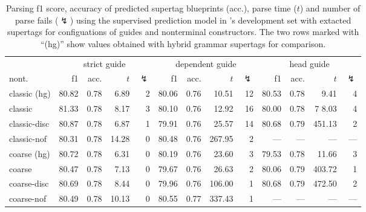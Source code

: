 \documentclass[../../document.tex]{subfiles}
\begin{document}
    \begin{table}
        \caption{\label{tbl:gridsearch:dcp:2}
        Parsing f1 score, accuracy of predicted supertag blueprints (acc.), parse time ($t$) and number of parse fails ($\lightning$) using the supervised prediction model in \negra{}'s development set with extacted  supertags for configuations of guides and nonterminal constructors. The two rows marked with ``(hg)'' show values obtained with hybrid grammar supertags for comparison.
        }
        \centering
        \setlength{\tabcolsep}{5pt}
        \vspace{.2cm}
        \begin{tabular}{l|rrrr|rrrr|rrrr}
            \toprule
                    & \multicolumn{4}{c|}{strict guide} &  \multicolumn{4}{c|}{dependent guide} &  \multicolumn{4}{c}{head guide} \\
nont.            & f1 & acc. & $t$ & $\lightning$ & f1 & acc. & $t$ & $\lightning$ & f1 & acc. & $t$ & $\lightning$ \\ \hline
\rowcolor{black!10}
classic (hg) & 80.82 & 0.78 &  6.89 & 2 & 80.06 & 0.76 &  10.51 & 12 & 80.53 & 0.78 &   9.41 & 4 \\\hline
classic      & 81.33 & 0.78 &  8.17 & 3 & 80.10 & 0.76 &  12.92 & 16 & 80.00 & 0.78 & 7 8.03 & 4 \\
classic-disc & 80.87 & 0.78 &  6.87 & 1 & 79.91 & 0.76 &  25.57 & 14 & 80.68 & 0.79 & 451.13 & 2 \\
classic-nof  & 80.31 & 0.78 & 14.28 & 0 & 80.48 & 0.76 & 267.95 &  2 &   --- &  --- &    --- & --- \\ \hline\rowcolor{black!10}
coarse (hg)  & 80.72 & 0.78 &  6.31 & 0 & 80.19 & 0.76 &  23.60 &  3 & 79.53 & 0.78 &  11.66 & 3 \\\hline
coarse       & 80.47 & 0.78 &  7.13 & 0 & 79.67 & 0.76 &  26.63 &  2 & 80.06 & 0.79 & 403.72 & 1 \\
coarse-disc  & 80.69 & 0.78 &  8.44 & 0 & 79.96 & 0.76 & 106.00 &  1 & 80.68 & 0.79 & 472.50 & 2 \\
coarse-nof   & 80.49 & 0.78 & 10.13 & 0 & 80.55 & 0.77 & 337.43 &  1 &   --- &  --- &    --- & --- \\
\bottomrule
        \end{tabular}
    \end{table}
\end{document}
